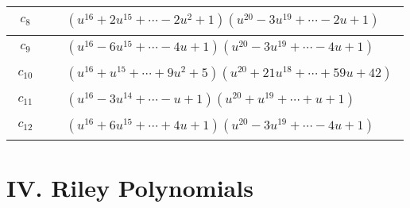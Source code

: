 \documentclass[1p]{elsarticle_modified}
\theoremstyle{definition}
\begin{document}
\begin{tabular}{m{50pt}|m{274pt}}
\hline $$\begin{aligned}c_{8}\end{aligned}$$&$\begin{aligned}
&(u^{16}+2 u^{15}+\cdots-2 u^2+1)(u^{20}-3 u^{19}+\cdots-2 u+1)
\end{aligned}$\\
\hline $$\begin{aligned}c_{9}\end{aligned}$$&$\begin{aligned}
&(u^{16}-6 u^{15}+\cdots-4 u+1)(u^{20}-3 u^{19}+\cdots-4 u+1)
\end{aligned}$\\
\hline $$\begin{aligned}c_{10}\end{aligned}$$&$\begin{aligned}
&(u^{16}+u^{15}+\cdots+9 u^2+5)(u^{20}+21 u^{18}+\cdots+59 u+42)
\end{aligned}$\\
\hline $$\begin{aligned}c_{11}\end{aligned}$$&$\begin{aligned}
&(u^{16}-3 u^{14}+\cdots- u+1)(u^{20}+u^{19}+\cdots+u+1)
\end{aligned}$\\
\hline $$\begin{aligned}c_{12}\end{aligned}$$&$\begin{aligned}
&(u^{16}+6 u^{15}+\cdots+4 u+1)(u^{20}-3 u^{19}+\cdots-4 u+1)
\end{aligned}$\\
\hline
\end{tabular}\newpage\renewcommand{\arraystretch}{1}
\centering \section*{ IV. Riley Polynomials}
\end{document}
